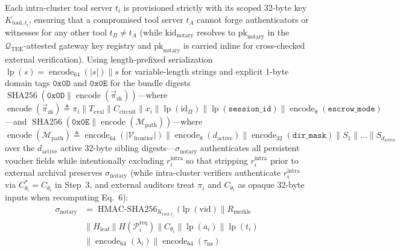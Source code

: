 \documentclass[conference,10pt]{IEEEtran}
\begin{document}
\begin{enumerate}
    Each intra-cluster tool server $t_i$ is provisioned strictly with its scoped 32-byte key $K_{\text{tool}, t_i}$, ensuring that a compromised tool server $t_A$ cannot forge authenticators or witnesses for any other tool $t_B \neq t_A$ (while $\text{kid}_{\text{notary}}$ resolves to $\text{pk}_{\text{notary}}$ in the $\mathcal{Q}_{\text{TEE}}$-attested gateway key registry and $\text{pk}_{\text{notary}}$ is carried inline for cross-checked external verification). Using length-prefixed serialization $\operatorname{lp}(s) = \operatorname{encode}_{64}(|s|) \parallel s$ for variable-length strings and explicit 1-byte domain tags $\mathtt{0x0D}$ and $\mathtt{0x0E}$ for the bundle digests $\operatorname{SHA256}(\mathtt{0x0D} \parallel \operatorname{encode}(\vec{\pi}_{\text{zk}}))$---where $\operatorname{encode}(\vec{\pi}_{\text{zk}}) \triangleq \pi_i \parallel T_{\text{eval}} \parallel C_{\text{circuit}} \parallel x_i \parallel \operatorname{lp}(\mathrm{id}_{\Pi}) \parallel \operatorname{lp}(\texttt{session\_id}) \parallel \operatorname{encode}_8(\texttt{escrow\_mode})$---and $\operatorname{SHA256}(\mathtt{0x0E} \parallel \operatorname{encode}(\mathcal{M}_{\text{path}}))$---where $\operatorname{encode}(\mathcal{M}_{\text{path}}) \triangleq \operatorname{encode}_{64}(|\mathcal{V}_{\text{frontier}}|) \parallel \operatorname{encode}_8(d_{\text{active}}) \parallel \operatorname{encode}_{32}(\texttt{dir\_mask}) \parallel S_1 \parallel \dots \parallel S_{d_{\text{active}}}$ over the $d_{\text{active}}$ active 32-byte sibling digests---$\sigma_{\text{notary}}$ authenticates all persistent voucher fields while intentionally excluding $r_i^{\text{intra}}$ so that stripping $r_i^{\text{intra}}$ prior to external archival preserves $\sigma_{\text{notary}}$ (while intra-cluster verifiers authenticate $r_i^{\text{intra}}$ via $C_{\theta_i}^* = C_{\theta_i}$ in Step~3, and external auditors treat $\pi_i$ and $C_{\theta_i}$ as opaque 32-byte inputs when recomputing Eq.~6):
    \begin{equation}
    \begin{split}
    \sigma_{\text{notary}} &= \operatorname{HMAC-SHA256}_{K_{\text{tool}, t_i}}\Big(\operatorname{lp}(\text{vid}) \parallel R_{\text{merkle}} \\
    &\parallel H_{\text{leaf}} \parallel H(\mathcal{P}_i^{\text{req}}) \parallel C_{\theta_i} \parallel \operatorname{lp}(a_i) \parallel \operatorname{lp}(t_i) \\
    &\parallel \operatorname{encode}_{64}(\lambda_i) \parallel \operatorname{encode}_{64}(\tau_{\text{ns}}) \\

\end{split}
\end{equation}
\end{enumerate}
\end{document}
